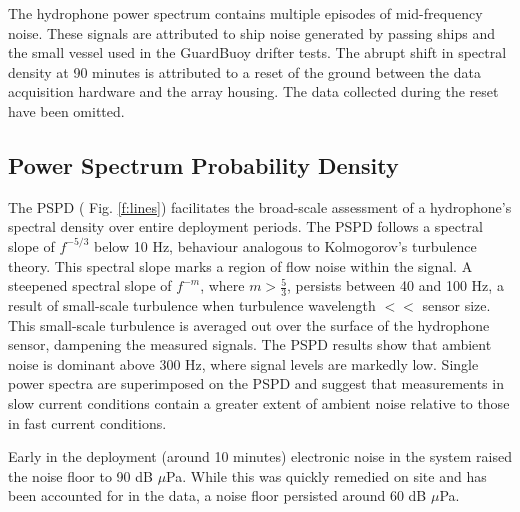 \documentclass[12pt,journal,onecolumn]{IEEEtran}
\begin{document}
The hydrophone power spectrum contains multiple episodes of mid-frequency noise. These signals are attributed to ship noise generated by passing ships and the small vessel used in the GuardBuoy drifter tests. The abrupt shift in spectral density at 90 minutes is attributed to a reset of the ground between the data acquisition hardware and the array housing. The data collected during the reset have been omitted.
\subsection{Power Spectrum Probability Density}
The PSPD ( Fig. \ref{f:lines}) facilitates the broad-scale assessment of a hydrophone's spectral density over entire deployment periods. The PSPD follows a spectral slope of $f^{-5/3}$ below 10 Hz, behaviour analogous to Kolmogorov's turbulence theory. This spectral slope marks a region of flow noise within the signal. A steepened spectral slope of $f^{-m}$, where $m>\frac{5}{3}$, persists between 40 and 100 Hz, a result of small-scale turbulence when turbulence wavelength $<<$ sensor size. This small-scale turbulence is averaged out over the surface of the hydrophone sensor, dampening the measured signals. The PSPD results show that ambient noise is dominant above 300 Hz, where signal levels are markedly low. Single power spectra are superimposed on the PSPD and suggest that measurements in slow current conditions contain a greater extent of ambient noise relative to those in fast current conditions. 

Early in the deployment (around 10 minutes) electronic noise in the system raised the noise floor to 90 dB $\mu$Pa. While this was quickly remedied on site and has been accounted for in the data, a noise floor persisted around 60 dB $\mu$Pa. 
\end{document}
